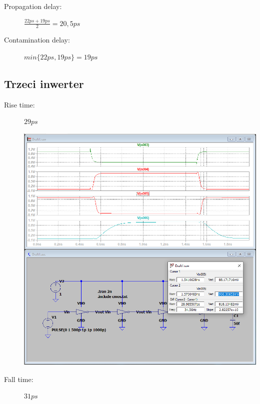\documentclass[a4paper, 11pt]{article}
\begin{document}
\begin{description}
\begin{center}
	      \end{center}
	\item[Propagation delay:] $\frac{22ps + 19ps}{2} = 20,5ps $
	\item[Contamination delay:] $ min\{22ps, 19ps\} = 19ps $
\end{description}

\pagebreak
\subsection{Trzeci inwerter}
\begin{description}
	\item[Rise time:] $29 ps$ \hfill
	      \begin{center}
		      \includegraphics[scale=0.38]{mikro_lab3/rise_time2.PNG}
	      \end{center}
	\item[Fall time:] $31 ps$ \hfill
	      \begin{center}

\end{center}
\end{description}
\end{document}
